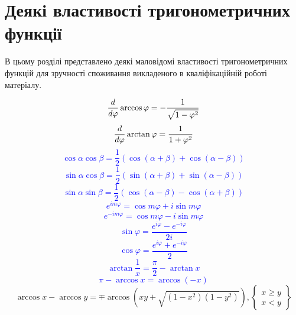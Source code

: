 \chapter{Деякі властивості тригонометричних функції}
\label{ch:trigonometric}

В цьому розділі представлено деякі маловідомі властивості тригонометричних 
функцій для зручності споживання викладеного в кваліфікаційній роботі 
матеріалу.

\textcolor{blue}{
\begin{equation*}
\frac{d }{d \varphi} \arccos \varphi = - \frac{1}{ \sqrt{1 - \varphi^2} }
\end{equation*}
%
\begin{equation*}
\frac{d }{d \varphi} \arctan \varphi = \frac{1}{1 + \varphi^2}
\end{equation*}
%
\begin{equation*}
\cos \alpha \cos \beta = \frac{1}{2} 
\left(  \cos (\alpha + \beta) + \cos (\alpha - \beta) \right)
\end{equation*}
%
\begin{equation*}
\sin \alpha \cos \beta = \frac{1}{2} 
\left( \sin (\alpha + \beta) + \sin (\alpha - \beta) \right)
\end{equation*}
%
\begin{equation*}
\sin \alpha \sin \beta = \frac{1}{2} 
\left( \cos (\alpha - \beta) - \cos (\alpha + \beta) \right)
\end{equation*}
%
\begin{equation*}
e^{im \varphi} = \cos m \varphi + i \sin m \varphi
\end{equation*}
%
\begin{equation*}
e^{-im \varphi} = \cos m \varphi - i \sin m \varphi
\end{equation*}
%
\begin{equation*}
\sin \varphi = \frac{e^{i \varphi} - e^{- i \varphi}}{2i}
\end{equation*}
%
\begin{equation*}
\cos \varphi = \frac{e^{i \varphi} + e^{- i \varphi}}{2}
\end{equation*}
%
\begin{equation*}
\arctan \frac{1}{x} = \frac{\pi}{2} - \arctan x
\end{equation*}
%
\begin{equation*}
\pi - \arccos x = \arccos (-x)
\end{equation*}
} %
%
\begin{equation}
\arccos x - \arccos y = \mp \arccos \left( 
xy + \sqrt{(1-x^2)(1-y^2)} \right),
\left\{ \begin{array}{c} x \ge y \\ x < y  \end{array} \right\}
\end{equation}
